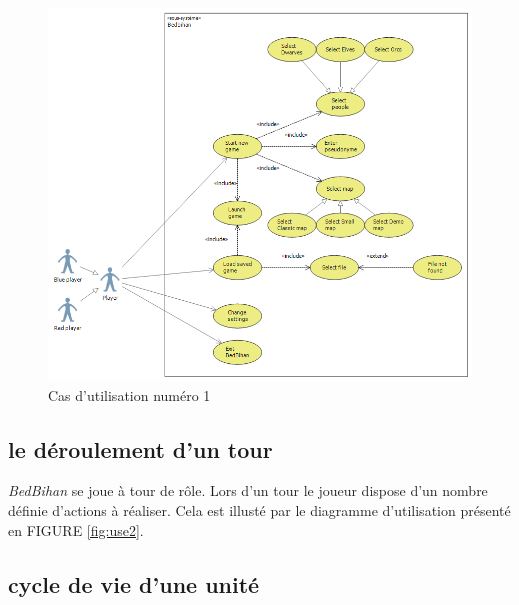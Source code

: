 		\begin{figure}
			\begin{center}
				\includegraphics[width=1\textwidth]{figure/cas_utilisation_1.png}
			\end{center}
			\caption{Cas d'utilisation numéro 1}
			\label{fig:use1}
		\end{figure}



	\subsection{le déroulement d'un tour}

		\emph{BedBihan} se joue à tour de rôle. Lors d'un tour le joueur dispose d'un nombre définie d'actions à réaliser. Cela est illusté par le diagramme d'utilisation présenté en FIGURE \ref{fig:use2}.


	\subsection{cycle de vie d'une unité}

